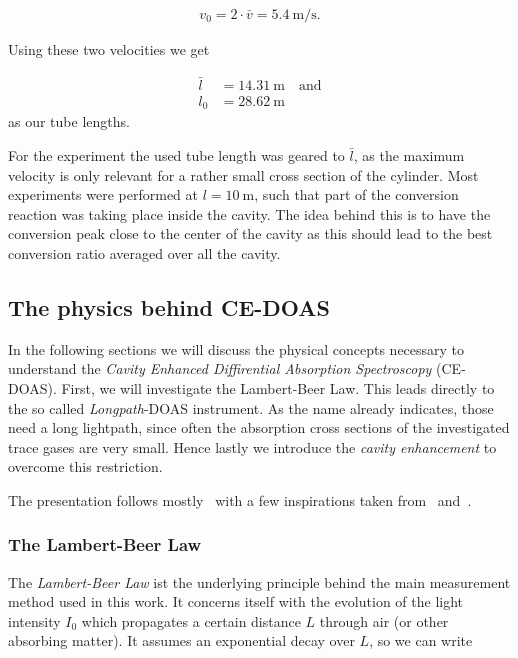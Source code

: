 \begin{align*}
  v_0 = 2\cdot \bar v = \SI{5.4}{\meter\per\second}.
\end{align*}

Using these two velocities we get

\begin{align*}
  \bar l & = \SI{14.31}{\meter} \quad \text{and}\\
  l_0 & = \SI{28.62}{\meter}
\end{align*}
as our tube lengths.

For the experiment the used tube length was geared to $\bar l$, as the maximum velocity is
only relevant for a rather small cross section of the
cylinder. Most experiments were performed at $l = \SI{10}{\meter}$,
such that part of the conversion reaction was taking place inside the
cavity. The idea behind this is to have the conversion peak close to
the center of the cavity as this should lead to the best conversion
ratio averaged over all the cavity.

\subsection{The physics behind CE-DOAS}
\label{sec:ce-doas-physics}

In the following sections we will discuss the physical concepts
necessary to understand the \emph{Cavity Enhanced Diffirential
Absorption Spectroscopy} (CE-DOAS). First, we will investigate the
Lambert-Beer Law. This leads directly to the so called
\emph{Longpath}-DOAS instrument. As the name already indicates, those
need a long lightpath, since often the absorption cross sections of
the investigated trace gases are very small. Hence lastly we introduce
the \emph{cavity enhancement} to overcome this restriction.

The presentation follows mostly~\cite{fp58} with a few inspirations
taken from~\cite{bsc} and~\cite{platt}.

\subsubsection{The Lambert-Beer Law}
\label{sec:lambert-beer}

The \emph{Lambert-Beer Law} ist the underlying principle behind the
main measurement method used in this work. It concerns itself with the
evolution of the light intensity $I_0$ which propagates a certain
distance $L$ through air (or other absorbing matter). It assumes an
exponential decay over $L$, so we can write

